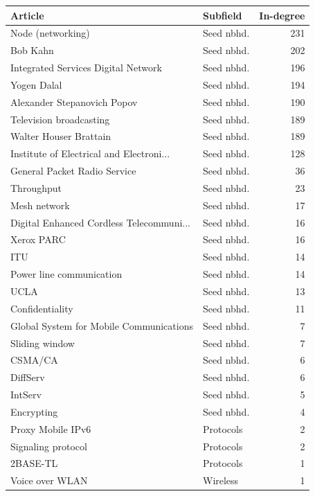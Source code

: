 
\begin{tabular}{llr}
\toprule
Article & Subfield & In-degree\\
\midrule
Node (networking) & Seed nbhd. & 231\\
Bob Kahn & Seed nbhd. & 202\\
Integrated Services Digital Network & Seed nbhd. & 196\\
Yogen Dalal & Seed nbhd. & 194\\
Alexander Stepanovich Popov & Seed nbhd. & 190\\
Television broadcasting & Seed nbhd. & 189\\
Walter Houser Brattain & Seed nbhd. & 189\\
Institute of Electrical and Electroni... & Seed nbhd. & 128\\
General Packet Radio Service & Seed nbhd. & 36\\
Throughput & Seed nbhd. & 23\\
Mesh network & Seed nbhd. & 17\\
Digital Enhanced Cordless Telecommuni... & Seed nbhd. & 16\\
Xerox PARC & Seed nbhd. & 16\\
ITU & Seed nbhd. & 14\\
Power line communication & Seed nbhd. & 14\\
UCLA & Seed nbhd. & 13\\
Confidentiality & Seed nbhd. & 11\\
Global System for Mobile Communications & Seed nbhd. & 7\\
Sliding window & Seed nbhd. & 7\\
CSMA/CA & Seed nbhd. & 6\\
DiffServ & Seed nbhd. & 6\\
IntServ & Seed nbhd. & 5\\
Encrypting & Seed nbhd. & 4\\
Proxy Mobile IPv6 & Protocols & 2\\
Signaling protocol & Protocols & 2\\
2BASE-TL & Protocols & 1\\
Voice over WLAN & Wireless & 1\\
\bottomrule
\end{tabular}
